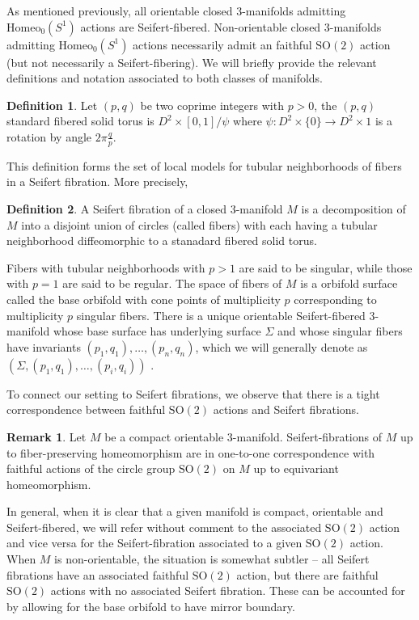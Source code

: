 \documentclass[10pt, oneside]{article}
\newcommand{\SO}[1][2]{\text{SO}(#1)}
\newcommand{\homeo}[1][S^1]{\text{Homeo}_0(#1)}
\theoremstyle{definition}
\newtheorem{defn}{Definition}[section]
\newtheorem{rem}{Remark}[section]
\theoremstyle{definition}
\begin{document}
As mentioned previously, all orientable closed 3-manifolds admitting $\homeo$ actions are Seifert-fibered. Non-orientable closed 3-manifolds admitting $\homeo$ actions necessarily admit an faithful $\SO$ action (but not necessarily a Seifert-fibering). We will briefly provide the relevant definitions and notation associated to both classes of manifolds.

\begin{defn}
    Let $(p, q)$ be two coprime integers with $p>0$, the $(p, q)$ standard fibered solid torus is $D^2\times [0, 1]/\psi$ where $\psi:D^2\times\{0\}\to D^2\times{1}$ is a rotation by angle $2\pi\frac{q}{p}$. 
\end{defn}

This definition forms the set of local models for tubular neighborhoods of fibers in a Seifert fibration. More precisely,

\begin{defn}
    A Seifert fibration of a closed 3-manifold $M$ is a decomposition of $M$ into a disjoint union of circles (called fibers) with each having a tubular neighborhood diffeomorphic to a stanadard fibered solid torus.
\end{defn}

Fibers with tubular neighborhoods with $p>1$ are said to be singular, while those with $p=1$ are said to be regular. The space of fibers of $M$ is a orbifold surface called the base orbifold with cone points of multiplicity $p$ corresponding to multiplicity $p$ singular fibers. There is a unique orientable Seifert-fibered 3-manifold whose base surface has underlying surface $\Sigma$ and whose singular fibers have invariants $(p_1, q_1),\dots,(p_n, q_n)$, which we will generally denote as $(\Sigma, (p_1, q_1),\dots,(p_i,q_i))$ \cite{martelli:IntroductionGeometric}.

To connect our setting to Seifert fibrations, we observe that there is a tight correspondence between faithful $\SO$ actions and Seifert fibrations.

\begin{rem}
    Let $M$ be a compact orientable 3-manifold. Seifert-fibrations of $M$ up to fiber-preserving homeomorphism are in one-to-one correspondence with faithful actions of the circle group $\SO$ on $M$ up to equivariant homeomorphism.
\end{rem}

In general, when it is clear that a given manifold is compact, orientable and Seifert-fibered, we will refer without comment to the associated $\SO$ action and vice versa for the Seifert-fibration associated to a given $\SO$ action. When $M$ is non-orientable, the situation is somewhat subtler -- all Seifert fibrations have an associated faithful $\SO$ action, but there are faithful $\SO$ actions with no associated Seifert fibration. These can be accounted for by allowing for the base orbifold to have mirror boundary.
\end{document}
